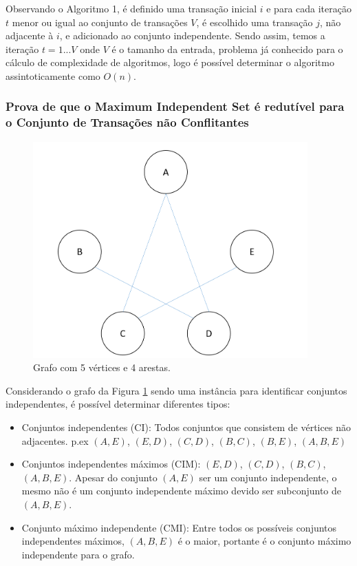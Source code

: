 \documentclass[conference]{IEEEtran}
\begin{document}
Observando o Algoritmo 1, é definido uma transação inicial $i$ e para cada iteração $t$ menor ou igual ao conjunto de transações $V$, é escolhido uma transação $j$, não adjacente à $i$, e adicionado ao conjunto independente. Sendo assim, temos a iteração $t = {1 ... V}$ onde $V$ é o tamanho da entrada, problema já conhecido para o cálculo de complexidade de algoritmos, logo é possível determinar o algoritmo assintoticamente como $O(n)$.

\subsubsection{Prova de que o Maximum Independent Set é redutível para o Conjunto de Transações não Conflitantes}

\begin{figure}[htbp!]
\centerline{\includegraphics[scale=0.5]{imgs/grafo_mis.png}}
\caption{Grafo com 5 vértices e 4 arestas.}
\label{fig:grafo_mis}
\end{figure}

Considerando o grafo da Figura \ref{fig:grafo_mis} sendo uma instância para identificar conjuntos independentes, é possível determinar diferentes tipos:

\begin{itemize}
    \item Conjuntos independentes (CI): Todos conjuntos que consistem de vértices não adjacentes. p.ex $(A, E)$, $(E, D)$, $(C, D)$, $(B, C)$, $(B, E)$, $(A, B, E)$
    \item Conjuntos independentes máximos (CIM): $(E, D)$, $(C, D)$, $(B, C)$, $(A, B, E)$. Apesar do conjunto $(A, E)$ ser um conjunto independente, o mesmo não é um conjunto independente máximo devido ser subconjunto de $(A, B, E)$.
    \item Conjunto máximo independente (CMI): Entre todos os possíveis conjuntos independentes máximos, $(A, B, E)$ é o maior, portante é o conjunto máximo independente para o grafo.
\end{itemize}
\end{document}
